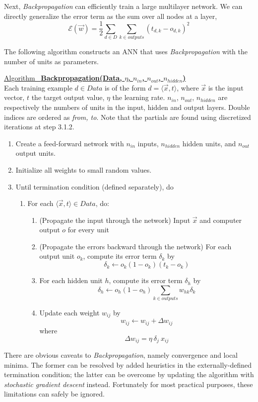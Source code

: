 \documentclass[12pt]{article}  %
\newcommand{\algtitle}[1]{\underline{Algorithm \ {\bf #1}} \vspace*{1mm}\\}
\begin{document}
Next, {\em Backpropagation} can efficiently train a large multilayer network. We can directly generalize the error term as the sum over all nodes at a layer, $$\mathcal{E}(\vec{w}) = \frac{1}{2} \sum_{d \in D} \sum_{k \in outputs} (t_{d,k} - o_{d,k})^2$$

The following algorithm constructs an ANN that uses {\em Backpropagation} with the number of units as parameters.


\algtitle{Backpropagation(Data, $\eta$, $n_{in}$, $n_{out}$, $n_{hidden}$)}
Each training example $d \in Data$ is of the form $d = \langle \vec{x}, t \rangle$, where $\vec{x}$ is the input vector, $t$ the target output value, $\eta$ the learning rate. $n_{in}$, $n_{out}$, $n_{hidden}$ are respectively the numbers of units in the input, hidden and output layers. Double indices are ordered as {\em from, to}. Note that the partials are found using discretized iterations at step 3.1.2.

\begin{enumerate}
	\item Create a feed-forward network with $n_{in}$ inputs, $n_{hidden}$ hidden units, and $n_{out}$ output units.
	\item Initialize all weights to small random values.
	\item Until termination condition (defined separately), do
		\begin{enumerate}
			\item For each $\langle \vec{x}, t \rangle \in Data$, do:
			\begin{enumerate}
				\item (Propagate the input through the network) Input $\vec{x}$ and computer output $o$ for every unit
				\item (Propagate the errors backward through the network) For each output unit $o_k$, compute its error term $\delta_k$ by $$\delta_k \leftarrow o_k(1-o_k)(t_k-o_k)$$
				\item For each hidden unit $h$, compute its error term $\delta_h$ by $$\delta_h \leftarrow o_h(1-o_h)\sum_{k \in outputs}w_{hk}\delta_{k}$$
				\item Update each weight $w_{ij}$ by $$w_{ij} \leftarrow w_{ij} + \Delta w_{ij}$$ where $$\Delta w_{ij} = \eta \ \delta_j \ x_{ij}$$
			\end{enumerate}
		\end{enumerate}
\end{enumerate}


There are obvious caveats to {\em Backpropagation}, namely convergence and local minima. The former can be resolved by added heuristics in the externally-defined termination condition; the latter can be overcome by updating the algorithm with {\em stochastic gradient descent} instead. Fortunately for most practical purposes, these limitations can safely be ignored.
\end{document}
